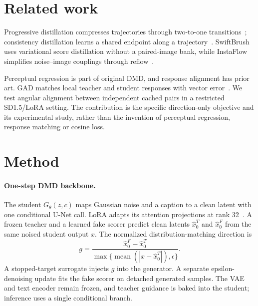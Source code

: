 \documentclass[10pt,twocolumn,letterpaper]{article}
\begin{document}
\section{Related work}
Progressive distillation compresses trajectories through two-to-one
transitions~\cite{salimans2022progressive}; consistency distillation learns
a shared endpoint along a trajectory~\cite{song2023consistency}. SwiftBrush
uses variational score distillation without a paired-image bank, while
InstaFlow simplifies noise--image couplings through
reflow~\cite{nguyen2024swiftbrush,liu2024instaflow}.

Perceptual regression is part of original DMD, and response alignment has
prior art. GAD matches local teacher and student responses with vector
error~\cite{huang2026gad}. We test angular alignment between independent
cached pairs in a restricted SD1.5/LoRA setting. The contribution is the
specific direction-only objective and its experimental study, rather than
the invention of perceptual regression, response matching or cosine loss.

\section{Method}
\paragraph{One-step DMD backbone.}
The student $G_\theta(z,c)$ maps Gaussian noise and a caption to a clean
latent with one conditional U-Net call. LoRA adapts its attention projections
at rank 32~\cite{hu2022lora}. A frozen teacher and a learned fake scorer
predict clean latents $\hat x_0^T$ and $\hat x_0^F$ from the same noised
student output $x$. The normalized distribution-matching direction is
\begin{equation}
g=\frac{\hat x_0^F-\hat x_0^T}
{\max\{\operatorname{mean}(|x-\hat x_0^T|),\epsilon\}}.
\end{equation}
A stopped-target surrogate injects $g$ into the generator. A separate
epsilon-denoising update fits the fake scorer on detached generated samples.
The VAE and text encoder remain frozen, and teacher guidance is baked into
the student; inference uses a single conditional branch.
\end{document}
